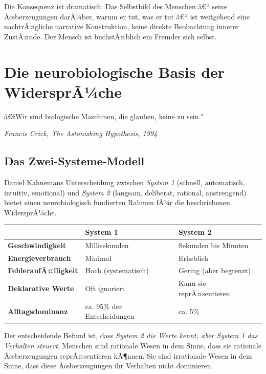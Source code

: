 ﻿\documentclass[12pt, a4paper]{article}
\begin{document}
Die Konsequenz ist dramatisch: Das Selbstbild des Menschen â€“ seine Ãœberzeugungen
darÃ¼ber, warum er tut, was er tut â€“ ist weitgehend eine nachtrÃ¤gliche narrative
Konstruktion, keine direkte Beobachtung innerer ZustÃ¤nde. Der Mensch ist
buchstÃ¤blich ein Fremder sich selbst.

\section{Die neurobiologische Basis der WidersprÃ¼che}

\epigraph{â€žWir sind biologische Maschinen, die glauben, keine zu sein."}%
{\textit{Francis Crick, The Astonishing Hypothesis, 1994}}

\subsection{Das Zwei-Systeme-Modell}

Daniel Kahnemans Unterscheidung zwischen \emph{System 1} (schnell, automatisch,
intuitiv, emotional) und \emph{System 2} (langsam, deliberat, rational, anstrengend)
bietet einen neurobiologisch fundierten Rahmen fÃ¼r die beschriebenen WidersprÃ¼che.

\medskip
\begin{tabular}{>{\bfseries}p{4cm} p{4.5cm} p{4.5cm}}
\toprule
& System 1 & System 2 \\
\midrule
Geschwindigkeit & Millisekunden & Sekunden bis Minuten \\
Energieverbrauch & Minimal & Erheblich \\
FehleranfÃ¤lligkeit & Hoch (systematisch) & Gering (aber begrenzt) \\
Deklarative Werte & Oft ignoriert & Kann sie reprÃ¤sentieren \\
Alltagsdominanz & ca. 95\% der Entscheidungen & ca. 5\% \\
\bottomrule
\end{tabular}
\medskip

Der entscheidende Befund ist, dass \emph{System 2 die Werte kennt, aber
System 1 das Verhalten steuert}. Menschen sind rationale Wesen in dem Sinne,
dass sie rationale Ãœberzeugungen reprÃ¤sentieren kÃ¶nnen. Sie sind irrationale
Wesen in dem Sinne, dass diese Ãœberzeugungen ihr Verhalten nicht dominieren.
\end{document}
